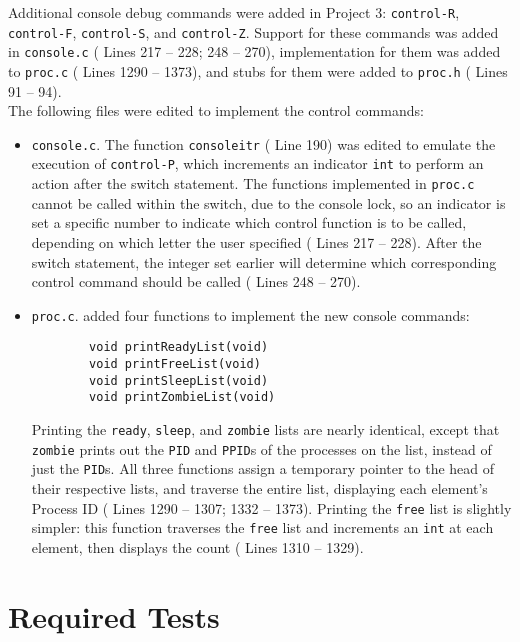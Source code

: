 \documentclass[11pt,letterpaper]{report}
\begin{document}
 	Additional console debug commands were added in Project 3: {\tt control-R}, {\tt control-F}, {\tt control-S}, and {\tt control-Z}. Support for these commands was added in {\tt console.c} ({\color{red} Lines 217 -- 228; 248 -- 270}), implementation for them was added to {\tt proc.c} ({\color{red} Lines 1290 -- 1373}), and stubs for them were added to {\tt proc.h} ({\color{red} Lines 91 -- 94}).\\
 	
 	The following files were edited to implement the control commands:
 	
 	\begin{itemize}
 		\item {\tt console.c}. The function {\tt consoleitr} ({\color{red} Line 190}) was edited to emulate the execution of {\tt control-P}, which increments an indicator {\tt int} to perform an action after the switch statement. The functions implemented in {\tt proc.c} cannot be called within the switch, due to the console lock, so an indicator is set a specific number to indicate which control function is to be called, depending on which letter the user specified ({\color{red} Lines 217 -- 228}). After the switch statement, the integer set earlier will determine which corresponding control command should be called ({\color{red} Lines 248 -- 270}).
 		
 		\item {\tt proc.c}. added four functions to implement the new console commands:
 		\begin{verbatim}
 		void printReadyList(void)
 		void printFreeList(void)
 		void printSleepList(void)
 		void printZombieList(void)
 		\end{verbatim}
 		Printing the {\tt ready}, {\tt sleep}, and {\tt zombie} lists are nearly identical, except that {\tt zombie} prints out the {\tt PID} and {\tt PPID}s of the processes on the list, instead of just the {\tt PID}s. All three functions assign a temporary pointer to the head of their respective lists, and traverse the entire list, displaying each element's Process ID ({\color{red} Lines 1290 -- 1307; 1332 -- 1373}). Printing the {\tt free} list is slightly simpler: this function traverses the {\tt free} list and increments an {\tt int} at each element, then displays the count ({\color{red} Lines 1310 -- 1329}).
 	\end{itemize}
 
 \newpage
 	
 	\section{Required Tests}
 	
\end{document}
